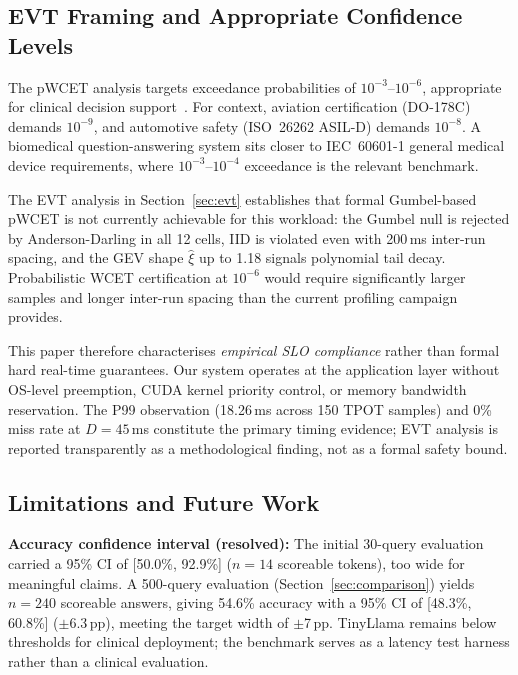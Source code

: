 \documentclass[conference]{IEEEtran}
\begin{document}
\subsection{EVT Framing and Appropriate Confidence Levels}

The pWCET analysis targets exceedance probabilities of $10^{-3}$--$10^{-6}$,
appropriate for clinical decision support~\cite{singhal2023large}.
For context, aviation certification (DO-178C) demands $10^{-9}$, and
automotive safety (ISO~26262 ASIL-D) demands $10^{-8}$.
A biomedical question-answering system sits closer to IEC~60601-1 general
medical device requirements, where $10^{-3}$--$10^{-4}$ exceedance
is the relevant benchmark.

The EVT analysis in Section~\ref{sec:evt} establishes that formal
Gumbel-based pWCET is not currently achievable for this workload:
the Gumbel null is rejected by Anderson-Darling in all 12 cells,
IID is violated even with 200\,ms inter-run spacing, and the GEV
shape $\hat{\xi}$ up to 1.18 signals polynomial tail decay.
Probabilistic WCET certification at $10^{-6}$ would require significantly
larger samples and longer inter-run spacing than the current profiling
campaign provides.

This paper therefore characterises \emph{empirical SLO compliance}
rather than formal hard real-time guarantees.
Our system operates at the application layer without OS-level preemption,
CUDA kernel priority control, or memory bandwidth reservation.
The P99 observation (18.26\,ms across 150 TPOT samples) and 0\% miss
rate at $D=45$\,ms constitute the primary timing evidence; EVT analysis
is reported transparently as a methodological finding, not as a
formal safety bound.

\subsection{Limitations and Future Work}
\label{sec:limitations}

\textbf{Accuracy confidence interval (resolved):}
The initial 30-query evaluation carried a 95\% CI of [50.0\%, 92.9\%]
($n{=}14$ scoreable tokens), too wide for meaningful claims.
A 500-query evaluation (Section~\ref{sec:comparison}) yields
$n{=}240$ scoreable answers, giving 54.6\% accuracy with a 95\% CI of
[48.3\%, 60.8\%] ($\pm$6.3\,pp), meeting the target width of $\pm$7\,pp.
TinyLlama remains below thresholds for clinical deployment; the
benchmark serves as a latency test harness rather than a clinical evaluation.
\end{document}
